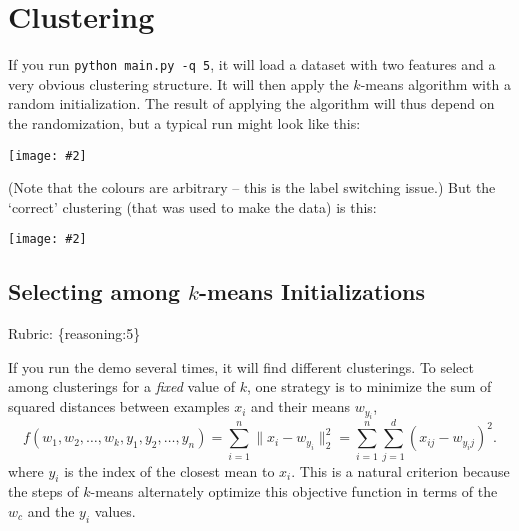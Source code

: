 \documentclass{article}
\def\rubric#1{\gre{Rubric: \{#1\}}}{}
\def\gre#1{{\color{gre}#1}}
\def\norm#1{\|#1\|}
\newcommand{\centerfig}[2]{\begin{center}\texttt{[image: \#2]}\end{center}}
\begin{document}
\section{Clustering}

If you run \verb|python main.py -q 5|, it will load a dataset with two features
and a very obvious clustering structure. It will then apply the $k$-means algorithm
with a random initialization. The result of applying the
algorithm will thus depend on the randomization, but a typical run might look like this:
\centerfig{.5}{../figs/kmeans_basic.png}
(Note that the colours are arbitrary -- this is the label switching issue.)
But the `correct' clustering (that was used to make the data) is this:
\centerfig{.5}{../figs/kmeans_good.png}


\subsection{Selecting among $k$-means Initializations}
\rubric{reasoning:5}

If you run the demo several times, it will find different clusterings. To select among clusterings for a \emph{fixed} value of $k$, one strategy is to minimize the sum of squared distances between examples $x_i$ and their means $w_{y_i}$,
\[
f(w_1,w_2,\dots,w_k,y_1,y_2,\dots,y_n) = \sum_{i=1}^n \norm{x_i - w_{y_i}}_2^2 = \sum_{i=1}^n \sum_{j=1}^d (x_{ij} - w_{y_ij})^2.
\]
 where $y_i$ is the index of the closest mean to $x_i$. This is a natural criterion because the steps of $k$-means alternately optimize this objective function in terms of the $w_c$ and the $y_i$ values.
\end{document}
